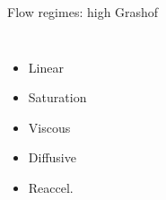 \documentclass[12pt]{beamer}
\begin{document}
\begin{frame}{Flow regimes: high Grashof}
\begin{columns}[c]
\begin{itemize}
  \item Linear 
  \item Saturation
  \item Viscous
  \item Diffusive
  \item Reaccel.
\end{itemize}

\end{columns}
\end{frame}
\end{document}
